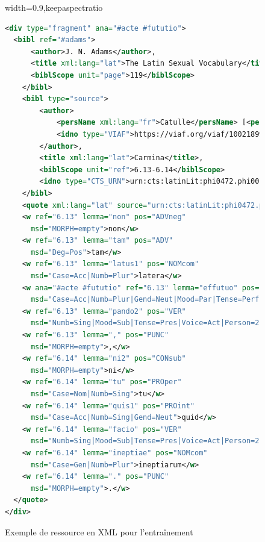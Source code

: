 \begin{figure}
    \centering
    \begin{adjustbox}{width=0.9\textwidth,keepaspectratio}
    \lstset{language=XML}
    \begin{lstlisting}[language=XML]
<div type="fragment" ana="#acte #fututio">
  <bibl ref="#adams">
      <author>J. N. Adams</author>,
      <title xml:lang="lat">The Latin Sexual Vocabulary</title>,
      <biblScope unit="page">119</biblScope>
    </bibl>
    <bibl type="source">
        <author>
            <persName xml:lang="fr">Catulle</persName> [<persName xml:lang="eng">Catullus, Gaius Valerius</persName>]
            <idno type="VIAF">https://viaf.org/viaf/100218993/</idno><idno type="LC">n79-6943</idno>
        </author>,
        <title xml:lang="lat">Carmina</title>,
        <biblScope unit="ref">6.13-6.14</biblScope>
        <idno type="CTS_URN">urn:cts:latinLit:phi0472.phi001.perseus-lat2</idno>
    </bibl>
    <quote xml:lang="lat" source="urn:cts:latinLit:phi0472.phi001.perseus-lat2:6.13-6.14" type="line">
    <w ref="6.13" lemma="non" pos="ADVneg" 
      msd="MORPH=empty">non</w>
    <w ref="6.13" lemma="tam" pos="ADV" 
      msd="Deg=Pos">tam</w>
    <w ref="6.13" lemma="latus1" pos="NOMcom" 
      msd="Case=Acc|Numb=Plur">latera</w>
    <w ana="#acte #fututio" ref="6.13" lemma="effutuo" pos="VER" 
      msd="Case=Acc|Numb=Plur|Gend=Neut|Mood=Par|Tense=Perf|Voice=Pass">ecfututa</w>
    <w ref="6.13" lemma="pando2" pos="VER" 
      msd="Numb=Sing|Mood=Sub|Tense=Pres|Voice=Act|Person=2">pandas</w>
    <w ref="6.13" lemma="," pos="PUNC" 
      msd="MORPH=empty">,</w>
    <w ref="6.14" lemma="ni2" pos="CONsub" 
      msd="MORPH=empty">ni</w>
    <w ref="6.14" lemma="tu" pos="PROper" 
      msd="Case=Nom|Numb=Sing">tu</w>
    <w ref="6.14" lemma="quis1" pos="PROint" 
      msd="Case=Acc|Numb=Sing|Gend=Neut">quid</w>
    <w ref="6.14" lemma="facio" pos="VER" 
      msd="Numb=Sing|Mood=Sub|Tense=Pres|Voice=Act|Person=2">facias</w>
    <w ref="6.14" lemma="ineptiae" pos="NOMcom" 
      msd="Case=Gen|Numb=Plur">ineptiarum</w>
    <w ref="6.14" lemma="." pos="PUNC" 
      msd="MORPH=empty">.</w>
  </quote>
</div>
    \end{lstlisting}
    \end{adjustbox}
    \caption{Exemple de ressource en XML pour l'entraînement}
    \label{fig:xml-model-example}
\end{figure}

